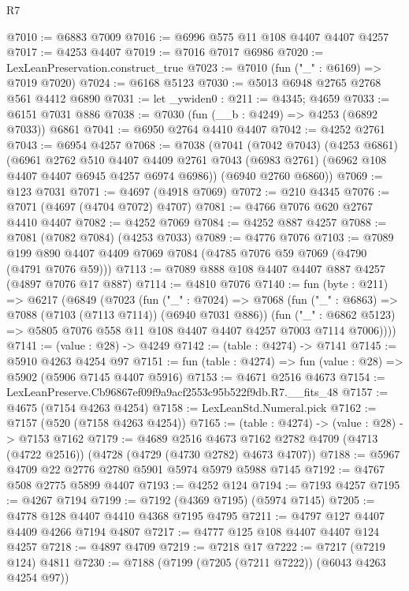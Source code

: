 \begin{lexlean}{R7}
\begin{coremodule}
@7010 := @6883 @7009
@7016 := @6996 @575 @11 @108 @4407 @4407 @4257
@7017 := @4253 @4407
@7019 := @7016 @7017 @6986
@7020 := LexLeanPreservation.construct_true
@7023 := @7010 (fun ("_" : @6169) => @7019 @7020)
@7024 := @6168 @5123
@7030 := @5013 @6948 @2765 @2768 @561 @4412 @6890
@7031 := let _ywiden0 : @211 := @4345; @4659
@7033 := @6151 @7031 @886
@7038 := @7030 (fun (__b : @4249) => @4253 (@6892 @7033)) @6861
@7041 := @6950 @2764 @4410 @4407
@7042 := @4252 @2761
@7043 := @6954 @4257
@7068 := @7038
    (@7041
      (@7042 @7043)
      (@4253 @6861)
      (@6961
        @2762
        @510
        @4407
        @4409
        @2761
        @7043
        (@6983 @2761)
        (@6962 @108 @4407 @4407 @6945 @4257 @6974 @6986))
      (@6940 @2760 @6860))
@7069 := @123 @7031
@7071 := @4697 (@4918 @7069)
@7072 := @210 @4345
@7076 := @7071 (@4697 (@4704 @7072) @4707)
@7081 := @4766 @7076 @620 @2767 @4410 @4407
@7082 := @4252 @7069
@7084 := @4252 @887 @4257
@7088 := @7081 (@7082 @7084) (@4253 @7033)
@7089 := @4776 @7076
@7103 := @7089 @199 @890 @4407 @4409 @7069 @7084 (@4785 @7076 @59 @7069 (@4790 (@4791 @7076 @59)))
@7113 := @7089 @888 @108 @4407 @4407 @887 @4257 (@4897 @7076 @17 @887)
@7114 := @4810 @7076
@7140 := fun (byte : @211) =>
  @6217
    (@6849
      (@7023
        (fun ("_" : @7024) =>
        @7068
          (fun ("_" : @6863) => @7088 (@7103 (@7113 @7114)) (@6940 @7031 @886))
          (fun ("_" : @6862 @5123) =>
          @5805 @7076 @558 @11 @108 @4407 @4407 @4257 @7003 @7114 @7006))))
@7141 := (value : @28) -> @4249
@7142 := (table : @4274) -> @7141
@7145 := @5910 @4263 @4254 @97
@7151 := fun (table : @4274) => fun (value : @28) => @5902 (@5906 @7145 @4407 @5916)
@7153 := @4671 @2516 @4673
@7154 := LexLeanPreserve.Cb96867ef09f9a9acf2553c95b522f9db.R7.__fits_48
@7157 := @4675 (@7154 @4263 @4254)
@7158 := LexLeanStd.Numeral.pick
@7162 := @7157 (@520 (@7158 @4263 @4254))
@7165 := (table : @4274) -> (value : @28) -> @7153 @7162
@7179 := @4689
    @2516
    @4673
    @7162
    @2782
    @4709
    (@4713 (@4722 @2516))
    (@4728 (@4729 (@4730 @2782) @4673 @4707))
@7188 := @5967 @4709 @22 @2776 @2780 @5901 @5974 @5979 @5988 @7145
@7192 := @4767 @508 @2775 @5899 @4407
@7193 := @4252 @124
@7194 := @7193 @4257
@7195 := @4267 @7194
@7199 := @7192 (@4369 @7195) (@5974 @7145)
@7205 := @4778 @128 @4407 @4410 @4368 @7195 @4795
@7211 := @4797 @127 @4407 @4409 @4266 @7194 @4807
@7217 := @4777 @125 @108 @4407 @4407 @124 @4257
@7218 := @4897 @4709
@7219 := @7218 @17
@7222 := @7217 (@7219 @124) @4811
@7230 := @7188 (@7199 (@7205 (@7211 @7222)) (@6043 @4263 @4254 @97))

\end{coremodule}
\end{lexlean}
